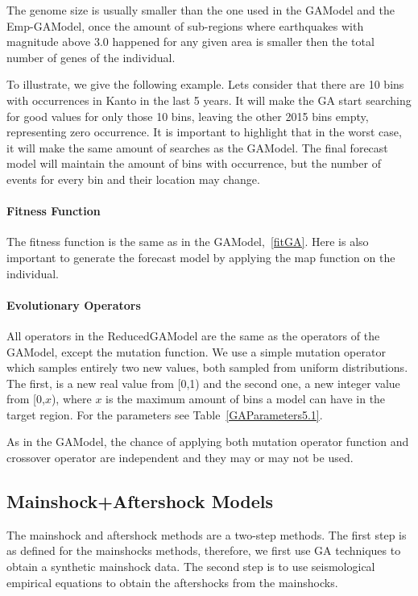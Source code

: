 The genome size is usually smaller than the one used in the GAModel and the Emp-GAModel, once the amount of sub-regions where earthquakes with magnitude above 3.0 happened for any given area is smaller then the total number of genes of the individual.

To illustrate, we give the following example. Lets consider that there are 10 bins with occurrences in Kanto in the last 5 years. It will make the GA start searching for good values for only those 10 bins, leaving the other 2015 bins empty, representing zero occurrence. It is important to highlight that in the worst case, it will make the same amount of searches as the GAModel. The final forecast model will maintain the amount of bins with occurrence, but the number of events for every bin and their location may change.

\paragraph{Fitness Function}
The fitness function is the same as in the GAModel,~\ref{fitGA}. Here is also important to generate the forecast model by applying the map function on the individual.

\paragraph{Evolutionary Operators}\label{ReducedOperators}
All operators in the ReducedGAModel are the same as the operators of the GAModel, except the mutation function. We use a simple mutation operator which samples entirely two new values, both sampled from uniform distributions. The first, is a new real value from [0,1) and the second one, a new integer value from [0,$x$), where $x$ is the maximum amount of bins a model can have in the target region. For the parameters see Table~\ref{GAParameters5.1}.

As in the GAModel, the chance of applying both mutation operator function and crossover operator are independent and they may or may not be used.

\subsection{Mainshock+Aftershock Models}
The mainshock and aftershock methods are a two-step methods. The first step is as defined for the mainshocks methods, therefore, we first use GA techniques to obtain a synthetic mainshock data. The second step is to use seismological empirical equations to obtain the aftershocks from the mainshocks.



